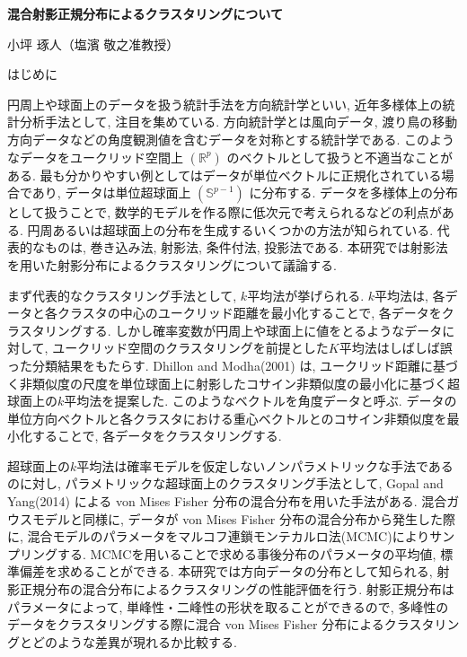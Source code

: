 \documentclass[a4j,11pt]{jarticle}
\makeatletter
\def\section{\@startsection{section}{1}{\z@}
   {0.8\Cvs \@plus.5\Cdp \@minus.2\Cdp}
   {0.2\Cvs \@plus.3\Cdp}
   {\normalfont \Large \bfseries}}
\makeatother
\begin{document}

\begin{center}
{\Large \textbf{混合射影正規分布によるクラスタリングについて}}
\end{center}
\begin{flushright}
小坪 琢人（塩濱 敬之准教授）
\end{flushright}
\vspace{-3zh}


\section{はじめに}

円周上や球面上のデータを扱う統計手法を方向統計学といい, 近年多様体上の統計分析手法として, 注目を集めている. 方向統計学とは風向データ, 渡り鳥の移動方向データなどの角度観測値を含むデータを対称とする統計学である. このようなデータをユークリッド空間上 $(\mathbb{R}^p)$ のベクトルとして扱うと不適当なことがある. 最も分かりやすい例としてはデータが単位ベクトルに正規化されている場合であり, データは単位超球面上 $(\mathbb{S}^{p-1})$ に分布する. データを多様体上の分布として扱うことで, 数学的モデルを作る際に低次元で考えられるなどの利点がある. 円周あるいは超球面上の分布を生成するいくつかの方法が知られている. 代表的なものは, 巻き込み法, 射影法, 条件付法, 投影法である. 本研究では射影法を用いた射影分布によるクラスタリングについて議論する.

まず代表的なクラスタリング手法として, $k$平均法が挙げられる. $k$平均法は, 各データと各クラスタの中心のユークリッド距離を最小化することで, 各データをクラスタリングする. しかし確率変数が円周上や球面上に値をとるようなデータに対して, ユークリッド空間のクラスタリングを前提とした$K$平均法はしばしば誤った分類結果をもたらす. Dhillon and Modha(2001) は, ユークリッド距離に基づく非類似度の尺度を単位球面上に射影したコサイン非類似度の最小化に基づく超球面上の$k$平均法を提案した. このようなベクトルを角度データと呼ぶ. データの単位方向ベクトルと各クラスタにおける重心ベクトルとのコサイン非類似度を最小化することで, 各データをクラスタリングする. 

超球面上の$k$平均法は確率モデルを仮定しないノンパラメトリックな手法であるのに対し,  パラメトリックな超球面上のクラスタリング手法として, Gopal and Yang(2014) による von Mises Fisher 分布の混合分布を用いた手法がある. 混合ガウスモデルと同様に, データが von Mises Fisher 分布の混合分布から発生した際に, 混合モデルのパラメータをマルコフ連鎖モンテカルロ法(MCMC)によりサンプリングする. MCMCを用いることで求める事後分布のパラメータの平均値, 標準偏差を求めることができる. 本研究では方向データの分布として知られる, 射影正規分布の混合分布によるクラスタリングの性能評価を行う. %
射影正規分布はパラメータによって, 単峰性・二峰性の形状を取ることができるので, 多峰性のデータをクラスタリングする際に混合 von Mises Fisher 分布によるクラスタリングとどのような差異が現れるか比較する.
\end{document}
